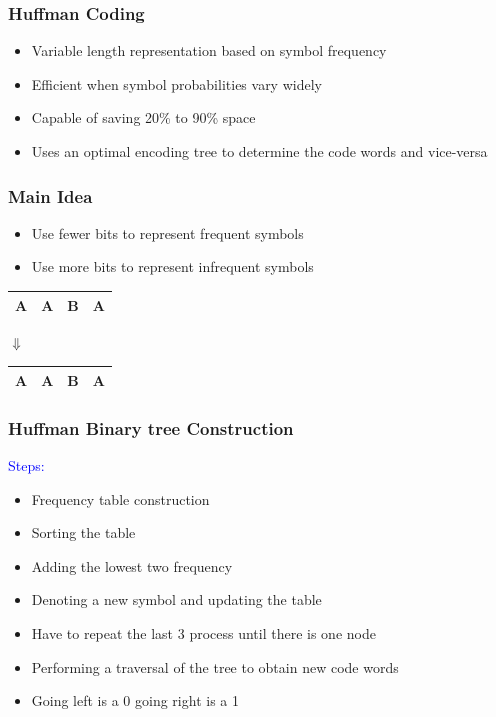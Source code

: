 \documentclass{beamer}
\begin{document}
\begin{frame}
\frametitle{\textbf{Huffman Coding}}
\begin{itemize}
\item Variable length representation based on symbol frequency
 \pause\item Efficient when symbol probabilities vary widely
 \pause\item Capable of saving 20\% to 90\% space
 \pause\item Uses an optimal encoding tree to determine the code words and vice-versa
\end{itemize}
\end{frame}

\begin{frame}
\frametitle{\textbf{Main Idea}}
 \begin{itemize}
  \item Use fewer bits to represent frequent symbols 
  \item Use more bits to represent infrequent symbols 
 \end{itemize}
 \begin{center}
\begin{tabular}{|   p{2cm}  |  p{2cm}  |  p{2cm}  |  p{2cm}  |}
 \hline
  A  & A & B & A\\
 \hline
\end{tabular} 
\end{center} 
\begin{center}
$ \Downarrow$
\end{center}
\begin{center}
\begin{tabular}{| p{1cm} | p{1cm} | p{2cm} | p{1cm} |}
 \hline
  A & A & B & A\\
 \hline
\end{tabular} 
\end{center} 
\end{frame}

\begin{frame}
  \frametitle{\textbf{Huffman Binary tree Construction}}
   \textcolor{blue}{Steps:}
  \begin{itemize}
   \item Frequency table construction
\item Sorting the table
\item Adding the lowest two frequency 
\item Denoting a new symbol and updating the table
\item Have to repeat the last 3 process until there is one node
\item Performing  a traversal of the tree to obtain new code words
\item Going left is a 0 going right is a 1
\end{itemize}

\end{frame}
\end{document}
